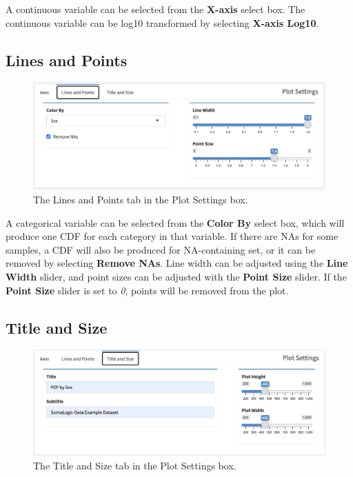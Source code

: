 \documentclass[
]{book}
\begin{document}
A continuous variable can be selected from the \textbf{X-axis} select box. The continuous variable can be log10 transformed by selecting \textbf{X-axis Log10}.

\hypertarget{lines-and-points}{%
\subsection{Lines and Points}\label{lines-and-points}}

\begin{figure}
\centering
\includegraphics{images/CDF_LinesPoints.png}
\caption{The Lines and Points tab in the Plot Settings box.}
\end{figure}

A categorical variable can be selected from the \textbf{Color By} select box, which will produce one CDF for each category in that variable. If there are NAs for some samples, a CDF will also be produced for NA-containing set, or it can be removed by selecting \textbf{Remove NAs}. Line width can be adjusted using the \textbf{Line Width} slider, and point sizes can be adjusted with the \textbf{Point Size} slider. If the \textbf{Point Size} slider is set to \emph{0}, points will be removed from the plot.

\hypertarget{title-and-size-1}{%
\subsection{Title and Size}\label{title-and-size-1}}

\begin{figure}
\centering
\includegraphics{images/CDF_TitleSize.png}
\caption{The Title and Size tab in the Plot Settings box.}
\end{figure}
\end{document}
